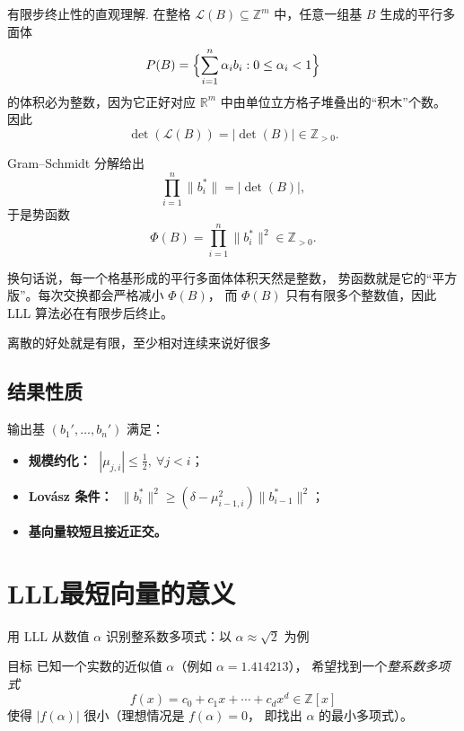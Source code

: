 \begin{proposition}{有限步终止性的直观理解.}
在整格 $\mathcal{L}(B)\subseteq \mathbb{Z}^m$ 中，任意一组基 $B$ 生成的平行多面体
\[
P(B) = \Bigl\{\sum_{i=1}^n \alpha_i b_i : 0 \leq \alpha_i < 1 \Bigr\}
\]
的体积必为整数，因为它正好对应 $\mathbb{R}^m$ 中由单位立方格子堆叠出的“积木”个数。  
因此
\[
\det(\mathcal{L}(B)) = |\det(B)| \in \mathbb{Z}_{>0}.
\]

Gram–Schmidt 分解给出
\[
\prod_{i=1}^n \|b_i^*\| = |\det(B)|,
\]
于是势函数
\[
\Phi(B) = \prod_{i=1}^n \|b_i^*\|^2 \in \mathbb{Z}_{>0}.
\]

换句话说，每一个格基形成的平行多面体体积天然是整数，  
势函数就是它的“平方版”。每次交换都会严格减小 $\Phi(B)$，  
而 $\Phi(B)$ 只有有限多个整数值，因此 LLL 算法必在有限步后终止。
\end{proposition}
\begin{dxtips}
    离散的好处就是有限，至少相对连续来说好很多
\end{dxtips}

\subsection*{结果性质}
输出基 $(b_1',\dots,b_n')$ 满足：
\begin{itemize}
  \item \textbf{规模约化：} $\; |\mu_{j,i}| \le \tfrac12,\ \forall j<i$；
  \item \textbf{Lovász 条件：} $\; \|b_i^*\|^2 \ge (\delta-\mu_{i-1,i}^2)\|b_{i-1}^*\|^2$；
  \item \textbf{基向量较短且接近正交。}
\end{itemize}
\section{LLL最短向量的意义}
用 LLL 从数值 \(\alpha\) 识别整系数多项式：以 \(\alpha\approx\sqrt2\) 为例

{目标}
已知一个实数的近似值 \(\alpha\)（例如 \(\alpha=1.414213\)），
希望找到一个\emph{整系数多项式}
\[
f(x)=c_0+c_1x+\cdots+c_dx^d\in\mathbb{Z}[x]
\]
使得 \(|f(\alpha)|\) 很小（理想情况是 \(f(\alpha)=0\)，
即找出 \(\alpha\) 的最小多项式）。

